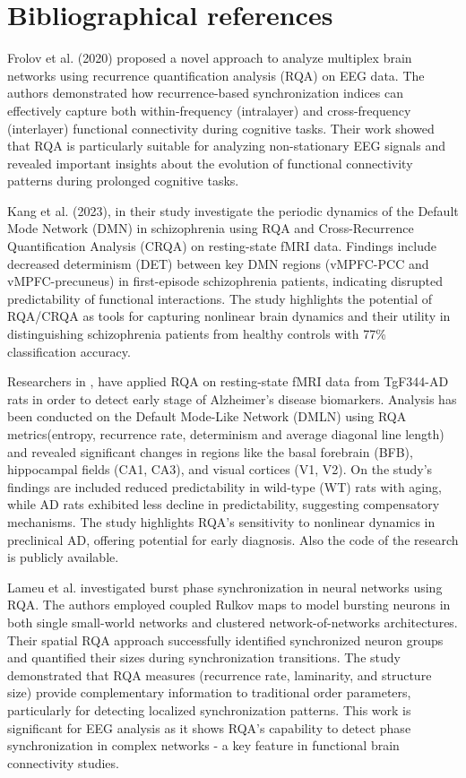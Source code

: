 \documentclass{article}
\begin{document}
\section*{Bibliographical references}

Frolov et al.\cite{frolov} (2020) proposed a novel approach to analyze multiplex brain networks using recurrence quantification analysis (RQA) 
on EEG data. The authors demonstrated how recurrence-based synchronization indices can effectively capture 
both within-frequency (intralayer) and cross-frequency (interlayer) functional connectivity during cognitive tasks. 
Their work showed that RQA is particularly suitable for analyzing non-stationary EEG signals and revealed
important insights about the evolution of functional connectivity patterns during prolonged cognitive tasks.

Kang et al. (2023)\cite{kang}, in their study investigate the periodic dynamics of the 
Default Mode Network (DMN) in schizophrenia using 
RQA and Cross-Recurrence Quantification Analysis (CRQA) on resting-state fMRI data. 
Findings include decreased determinism (DET) between key DMN regions 
(vMPFC-PCC and vMPFC-precuneus) in first-episode schizophrenia patients, 
indicating disrupted predictability of functional interactions. 
The study highlights the potential of RQA/CRQA as tools for capturing nonlinear brain dynamics 
and their utility in distinguishing schizophrenia patients from healthy controls with 77\% 
classification accuracy.

Researchers in \cite{rezaei},
have applied RQA on resting-state fMRI data from TgF344-AD rats in order 
to detect early stage of Alzheimer's disease biomarkers. 
Analysis has been conducted on the Default Mode-Like Network (DMLN) 
using RQA metrics(entropy, recurrence rate, determinism and average diagonal line length) 
and revealed significant changes in regions like 
the basal forebrain (BFB), hippocampal fields (CA1, CA3), and visual 
cortices (V1, V2). 
On the study's findings are included reduced predictability in 
wild-type (WT) rats with aging, while AD rats exhibited less decline
in predictability, suggesting compensatory mechanisms. 
The study highlights RQA's sensitivity to nonlinear dynamics 
in preclinical AD, offering potential for early diagnosis. Also the code of the
research is publicly available.

Lameu et al.\cite{lameu2018} investigated burst phase synchronization in neural networks using 
RQA. The authors employed coupled Rulkov maps to model bursting neurons in both single small-world networks
and clustered network-of-networks architectures. Their spatial RQA approach successfully identified 
synchronized neuron groups and quantified their sizes during synchronization transitions. The study
demonstrated that RQA measures (recurrence rate, laminarity, and structure size) provide complementary 
information to traditional order parameters, particularly for detecting localized synchronization patterns. 
This work is significant for EEG analysis as it shows RQA's capability to detect phase synchronization 
in complex networks - a key feature in functional brain connectivity studies.
\end{document}
